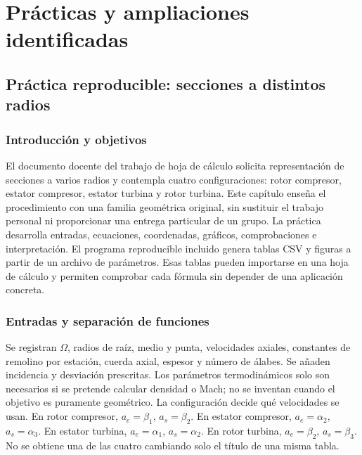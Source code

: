 \documentclass[10pt,openany]{book}
\begin{document}
\studiumchaptercheck

\part{Prácticas y ampliaciones identificadas}

\chapter{Práctica reproducible: secciones a distintos radios}
\label{chap:c18}


\section{Introducción y objetivos}

El documento docente del trabajo de hoja de cálculo solicita representación de secciones a varios radios y contempla cuatro configuraciones: rotor compresor, estator compresor, estator turbina y rotor turbina. Este capítulo enseña el procedimiento con una familia geométrica original, sin sustituir el trabajo personal ni proporcionar una entrega particular de un grupo.
La práctica desarrolla entradas, ecuaciones, coordenadas, gráficos, comprobaciones e interpretación. El programa reproducible incluido genera tablas CSV y figuras a partir de un archivo de parámetros. Esas tablas pueden importarse en una hoja de cálculo y permiten comprobar cada fórmula sin depender de una aplicación concreta.

\section{Entradas y separación de funciones}

Se registran \(\Omega\), radios de raíz, medio y punta, velocidades axiales, constantes de remolino por estación, cuerda axial, espesor y número de álabes. Se añaden incidencia y desviación prescritas. Los parámetros termodinámicos solo son necesarios si se pretende calcular densidad o Mach; no se inventan cuando el objetivo es puramente geométrico.
La configuración decide qué velocidades se usan. En rotor compresor, \(a_e=\beta_1\), \(a_s=\beta_2\). En estator compresor, \(a_e=\alpha_2\), \(a_s=\alpha_3\). En estator turbina, \(a_e=\alpha_1\), \(a_s=\alpha_2\). En rotor turbina, \(a_e=\beta_2\), \(a_s=\beta_3\). No se obtiene una de las cuatro cambiando solo el título de una misma tabla.
\end{document}
